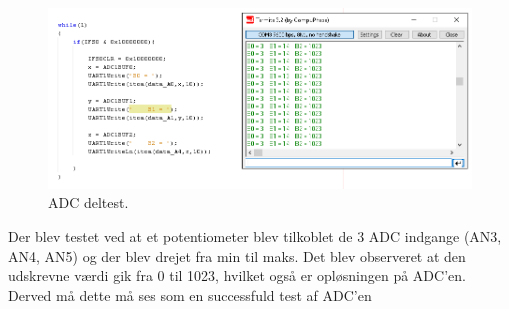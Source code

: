 \begin{figure}[h!]
  \centering
  \includegraphics[width=1.0\textwidth]{figures/adc_software_test.png}
  \caption{ADC deltest.}
  \label{adcDelTest}
\end{figure} 

Der blev testet ved at et potentiometer blev tilkoblet de 3 ADC indgange (AN3, AN4, AN5) og der blev drejet fra min til maks. Det blev observeret at den udskrevne værdi gik fra 0 til 1023, hvilket også er opløsningen på ADC'en. Derved må dette må ses som en successfuld test af ADC'en
